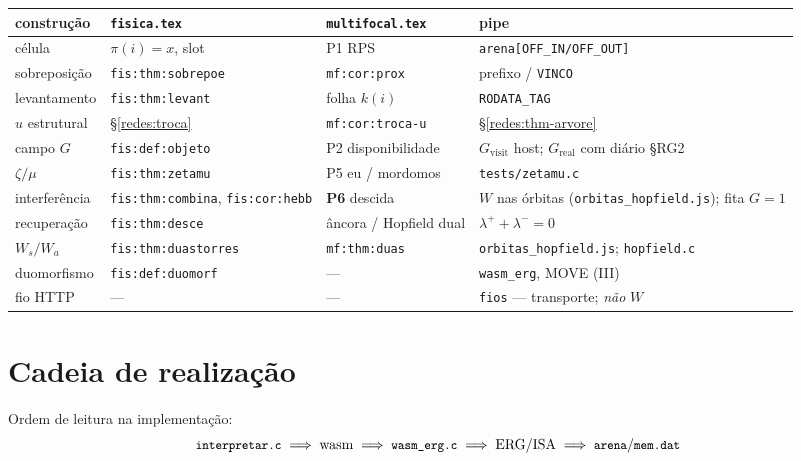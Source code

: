 \documentclass[11pt,a4paper]{article}
\newcommand{\code}[1]{\texttt{\small #1}}
\providecommand{\pt}[1]{\textbf{P#1}}
\begin{document}
\begin{center}
{\footnotesize
\begin{tabular}{@{}>{\raggedright\arraybackslash}p{}>{\raggedright\arraybackslash}p{}>{\raggedright\arraybackslash}p{}>{\raggedright\arraybackslash}p{}@{}}
\toprule
construção & \code{fisica.tex} & \code{multifocal.tex} & pipe \\
\midrule
célula & $\pi(i)=x$, slot & P1 RPS & \code{arena[OFF\_IN/OFF\_OUT]} \\
sobreposição & \code{fis:thm:sobrepoe} & \code{mf:cor:prox} & prefixo / \code{VINCO} \\
levantamento & \code{fis:thm:levant} & folha $k(i)$ & \code{RODATA\_TAG} \\
$u$ estrutural & §\ref{redes:troca} & \code{mf:cor:troca-u} & §\ref{redes:thm-arvore} \\
campo $G$ & \code{fis:def:objeto} & P2 disponibilidade &
$G_{\mathrm{visit}}$ host; $G_{\mathrm{real}}$ com diário §RG2 \\
$\zeta/\mu$ & \code{fis:thm:zetamu} & P5 eu / mordomos & \code{tests/zetamu.c} \\
interferência & \code{fis:thm:combina}, \code{fis:cor:hebb} & \pt{6} descida & $W$ nas órbitas (\code{orbitas\_hopfield.js}); fita $G=1$ \\
recuperação & \code{fis:thm:desce} & âncora / Hopfield dual & $\lambda^{+}+\lambda^{-}=0$ \\
$W_s/W_a$ & \code{fis:thm:duastorres} & \code{mf:thm:duas} & \code{orbitas\_hopfield.js}; \code{hopfield.c} \\
duomorfismo & \code{fis:def:duomorf} & --- & \code{wasm\_erg}, MOVE (III) \\
fio HTTP & --- & --- & \code{fios} --- transporte; \emph{não} $W$ \\
\bottomrule
\end{tabular}}
\end{center}

\section{Cadeia de realização}\label{redes:cadeia}

\noindent Ordem de leitura na implementação:
\[
\text{\code{interpretar.c}}
\;\Longrightarrow\;
\text{wasm}
\;\Longrightarrow\;
\text{\code{wasm\_erg.c}}
\;\Longrightarrow\;
\text{ERG/ISA}
\;\Longrightarrow\;
\text{\code{arena}/\code{mem.dat}}
\]
\end{document}

